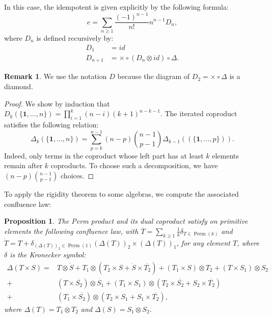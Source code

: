 \documentclass[11pt,leqno]{amsart}
\theoremstyle{definition}
\newtheorem{remark}[definition]{Remark}
\theoremstyle{plain}
\newtheorem{proposition}[definition]{Proposition}
\begin{document}
In this case, the idempotent is given explicitly by the following formula:
\begin{equation*}
e= \sum_{n \geq 1} \frac{(-1)^{n-1}}{n!} n^{n-1} D_n,
\end{equation*} 
where $D_n$ is defined recursively by:
\begin{align*} 
D_{1} &=id  \\
D_{n+1} &= \times \circ (D_n \otimes id) \circ \Delta.
\end{align*}

\begin{remark}
We use the notation $D$ because the diagram of $D_2 = \times \circ \Delta$ is a diamond.
\end{remark}

\begin{proof}
We show by induction that $D_k(\{\mathbf{1}, \ldots, n\}) = \prod_{i=1}^k (n-i) (k+1)^{n-k-1}$. The iterated coproduct satisfies the following relation:
\begin{equation*}
\Delta_k (\{\mathbf{1}, \ldots, n\}) = \sum_{p=k}^{n-1} (n-p) \binom{n-1}{p-1} \Delta_{k-1}((\{\mathbf{1}, \ldots, p\})).
\end{equation*}
Indeed, only terms in the coproduct whose left part has at least $k$ elements remain after $k$ coproducts. To choose such a decomposition, we have $(n-p) \binom{n-1}{p-1}$ choices.
\end{proof}


To apply the rigidity theorem to some algebras, we compute the associated confluence law:

\begin{proposition}
The Perm product and its dual coproduct satisfy on primitive elements the following confluence law, with $\overline{T}=\sum_{k \geq 1} \frac{1}{k} \delta_{T \in \operatorname{Perm}(k)} $ and $\dot{T}=T + \delta_{ (\Delta(T))_2 \in \operatorname{Perm}(1)} (\Delta(T))_2 \times (\Delta(T))_1$, for any element $T$, where $\delta$ is the Kronecker symbol:
\begin{align*}\label{RelCompPerm}
\Delta(T \times S) =& T \otimes \dot{S} + T_1 \otimes (T_2 \times S + \dot{S} \times \overline{T_2}) + (T_1 \times S) \otimes T_2 + (T \times S_1) \otimes S_2 \\ 
+& (T \times \overline{S_2}) \otimes \dot{S_1}+ (T_1 \times S_1) \otimes (T_2 \times \overline{S_2} + S_2 \times \overline{T_2}) \\
+& (T_1 \times \overline{S_2}) \otimes (T_2 \times S_1 +  S_1 \times \overline{T_2}),
\end{align*}
where $\Delta(T) = T_1 \otimes T_2$ and $\Delta(S) = S_1 \otimes S_2$.
\end{proposition}
\end{document}
